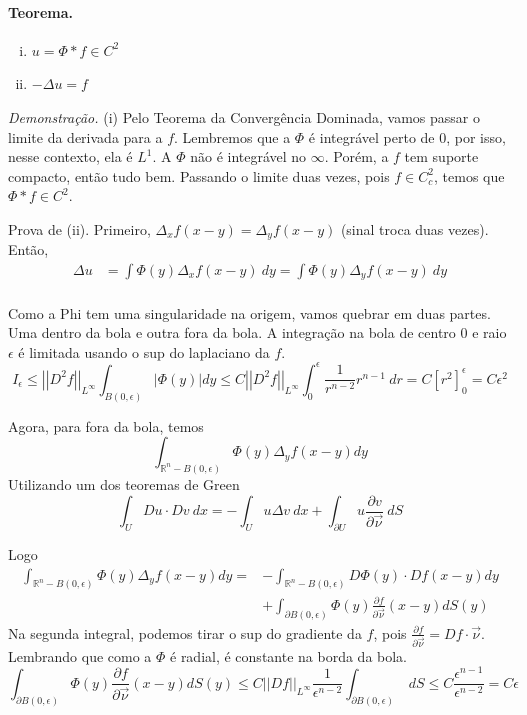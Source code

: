 \documentclass[11pt]{article}
\newcommand{\p}{\partial}
\newcommand{\e}{\epsilon}
\newcommand{\pde}[2]{\frac{\p #1}{\p #2}}
\newcommand{\dirdev}[1]{\pde{#1}{\vec{\nu}}}
\newcommand{\norm}[2]{\left|\left|#1\right|\right|_{L^{#2}}}
\begin{document}
\paragraph{Teorema.}\begin{enumerate}[(i)]
	\item \(u=\Phi* f \in C^2\)
	\item \(-\Delta u =f\)
\end{enumerate}

\textit{Demonstração.} (i) Pelo Teorema da Convergência Dominada, vamos passar o limite da derivada para a \(f\). Lembremos que a \(\Phi\) é integrável perto de 0, por isso, nesse contexto, ela é \(L^1\). A \(\Phi\) não é integrável no \(\infty\). Porém, a \(f\) tem suporte compacto, então tudo bem. Passando o limite duas vezes, pois \(f \in C^2_c\), temos que \(\Phi * f \in C^2\).

Prova de (ii). Primeiro, \(\Delta_xf(x-y)=\Delta_yf(x-y)\) (sinal troca duas vezes). Então, \begin{align*}
	\Delta u &= \int \Phi(y) \Delta_x f(x-y)\ dy = \int \Phi(y) \Delta_y f(x-y)\ dy\\
\end{align*}

Como a Phi tem uma singularidade na origem, vamos quebrar em duas partes. Uma dentro da bola e outra fora da bola. A integração na bola de centro 0 e raio \(\e\) é limitada usando o sup do laplaciano da \(f\). 
\[ I_\epsilon \leq \norm{D^2 f}{\infty} \int_{ B(0,\epsilon) } | \Phi (y) | dy \leq C \norm{D^2 f}{\infty} \int_0^\e \frac{1}{r^{n-2}}r^{n-1}\ dr = C \left[ r^2\right]_0^\e = C\e^2\]

Agora, para fora da bola, temos
\[ \int_{\mathbb{R}^n - B(0, \epsilon)} \Phi (y) \Delta_y f(x-y) dy \]
Utilizando um dos teoremas de Green \[\int_U Du\cdot Dv\ dx = -\int_U u \Delta v\ dx + \int_{\p U} u \dirdev{v}\ dS\]

Logo \begin{align*}
	\int_{\mathbb{R}^n - B(0, \epsilon)} \Phi (y) \Delta_y f(x-y) dy = &- \int_{\mathbb{R}^n - B(0, \epsilon)} D \Phi (y)\cdot D f(x-y) dy\\ &+ \int_{\partial B(0, \epsilon)} \Phi(y) \dirdev{f}(x-y) dS(y) 
\end{align*} 
Na segunda integral, podemos tirar o sup do gradiente da \(f\), pois \(\dirdev{f}=Df \cdot \vec{\nu}\). Lembrando que como a \(\Phi\) é radial, é constante na borda da bola.
\[\int_{\partial B(0, \epsilon)} \Phi(y) \dirdev{f}(x-y) dS(y) \leq C \norm{Df}{\infty} \frac{1}{\e^{n-2}} \int_{\partial B(0, \epsilon)}\ dS \leq  C \frac{\e^{n-1}}{\e^{n-2}}= C\e \]
\end{document}

